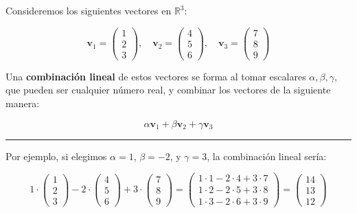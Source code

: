 \documentclass[
  letterpaper,
  DIV=11,
  numbers=noendperiod]{scrartcl}
\begin{document}
Consideremos los siguientes vectores en \(\mathbb{R}^3\):

\[
\mathbf{v}_1 = \begin{pmatrix}
1 \\
2 \\
3
\end{pmatrix}, \quad \mathbf{v}_2 = \begin{pmatrix}
4 \\
5 \\
6
\end{pmatrix}, \quad \mathbf{v}_3 = \begin{pmatrix}
7 \\
8 \\
9
\end{pmatrix}
\]

Una \textbf{combinación lineal} de estos vectores se forma al tomar
escalares \(\alpha, \beta, \gamma\), que pueden ser cualquier número
real, y combinar los vectores de la siguiente manera:

\[
\alpha \mathbf{v}_1 + \beta \mathbf{v}_2 + \gamma \mathbf{v}_3
\]

\begin{center}\rule{0.5\linewidth}{0.5pt}\end{center}

Por ejemplo, si elegimos \(\alpha = 1\), \(\beta = -2\), y
\(\gamma = 3\), la combinación lineal sería:

\[
1 \cdot \begin{pmatrix}
1 \\
2 \\
3
\end{pmatrix} - 2 \cdot \begin{pmatrix}
4 \\
5 \\
6
\end{pmatrix} + 3 \cdot \begin{pmatrix}
7 \\
8 \\
9
\end{pmatrix} = \begin{pmatrix}
1 \cdot 1 - 2 \cdot 4 + 3 \cdot 7 \\
1 \cdot 2 - 2 \cdot 5 + 3 \cdot 8 \\
1 \cdot 3 - 2 \cdot 6 + 3 \cdot 9
\end{pmatrix} = \begin{pmatrix}
14 \\
13 \\
12
\end{pmatrix}
\]
\end{document}
